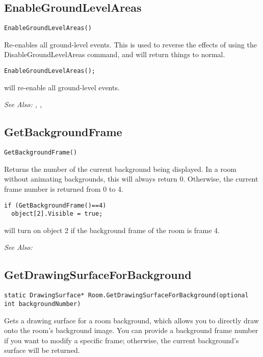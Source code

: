 \subsection{EnableGroundLevelAreas}\label{EnableGroundLevelAreas}%

\begin{verbatim}
EnableGroundLevelAreas()
\end{verbatim}
Re-enables all ground-level events. This is used to reverse the effects of
using the DisableGroundLevelAreas command, and will return things to normal.

\begin{verbatim}
EnableGroundLevelAreas();
\end{verbatim}
will re-enable all ground-level events.

\it{See Also:} , ,


\subsection{GetBackgroundFrame}\label{GetBackgroundFrame}%

\begin{verbatim}
GetBackgroundFrame()
\end{verbatim}
Returns the number of the current background being displayed. In a room
without animating backgrounds, this will always return 0. Otherwise, the
current frame number is returned from 0 to 4.

\begin{verbatim}
if (GetBackgroundFrame()==4)
  object[2].Visible = true;
\end{verbatim}
will turn on object 2 if the background frame of the room is frame 4.

\it{See Also:} 


\subsection{GetDrawingSurfaceForBackground}\label{Room.GetDrawingSurfaceForBackground}%

\begin{verbatim}
static DrawingSurface* Room.GetDrawingSurfaceForBackground(optional int backgroundNumber)
\end{verbatim}
Gets a drawing surface for a room background, which allows you to directly draw
onto the room's background image. You can provide a background frame number if you
want to modify a specific frame; otherwise, the current background's surface will be returned.

